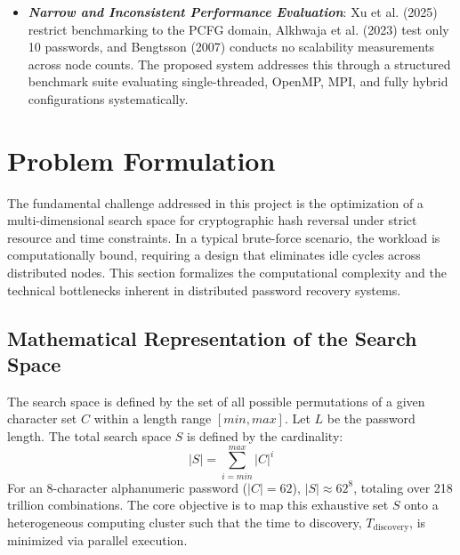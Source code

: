 \documentclass[12pt,a4paper]{article}
\begin{document}
\begin{itemize}
    \item \textit{\textbf{Narrow and Inconsistent Performance Evaluation}}: Xu et al. (2025) restrict benchmarking to the PCFG domain, Alkhwaja et al. (2023) test only 10 passwords, and Bengtsson (2007) conducts no scalability measurements across node counts. The proposed system addresses this through a structured benchmark suite evaluating single-threaded, OpenMP, MPI, and fully hybrid configurations systematically.

\end{itemize}


\newpage
\setcounter{section}{3} %

\section{Problem Formulation}

The fundamental challenge addressed in this project is the optimization of a multi-dimensional search space for cryptographic hash reversal under strict resource and time constraints. In a typical brute-force scenario, the workload is computationally bound, requiring a design that eliminates idle cycles across distributed nodes. This section formalizes the computational complexity and the technical bottlenecks inherent in distributed password recovery systems.

\subsection{Mathematical Representation of the Search Space}
The search space is defined by the set of all possible permutations of a given character set $C$ within a length range $[min, max]$. Let $L$ be the password length. The total search space $S$ is defined by the cardinality:
\begin{equation}
|S| = \sum_{i=min}^{max} |C|^i
\end{equation}
For an 8-character alphanumeric password ($|C|=62$), $|S| \approx 62^8$, totaling over 218 trillion combinations. The core objective is to map this exhaustive set $S$ onto a heterogeneous computing cluster such that the time to discovery, $T_{\text{discovery}}$, is minimized via parallel execution.
\end{document}
